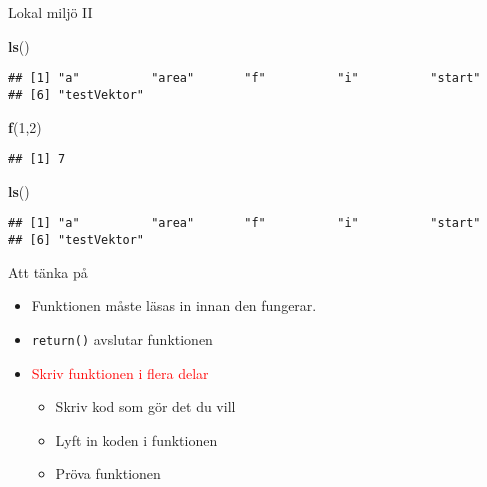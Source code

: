 \documentclass[
  10pt,
  ignorenonframetext,
]{beamer}
\newenvironment{Shaded}{\begin{snugshade}}{\end{snugshade}}
\newcommand{\DecValTok}[1]{\textcolor[rgb]{0.00,0.00,0.81}{#1}}
\newcommand{\FunctionTok}[1]{\textcolor[rgb]{0.13,0.29,0.53}{\textbf{#1}}}
\newcommand{\NormalTok}[1]{#1}
\providecommand{\tightlist}{%
  \setlength{\itemsep}{0pt}\setlength{\parskip}{0pt}}
\begin{document}
\begin{frame}[fragile]{Lokal miljö II}
\protect\hypertarget{lokal-miljuxf6-ii}{}
\begin{Shaded}
\begin{Highlighting}[]
\FunctionTok{ls}\NormalTok{()}
\end{Highlighting}
\end{Shaded}

\begin{verbatim}
## [1] "a"          "area"       "f"          "i"          "start"     
## [6] "testVektor"
\end{verbatim}

\begin{Shaded}
\begin{Highlighting}[]
\FunctionTok{f}\NormalTok{(}\DecValTok{1}\NormalTok{,}\DecValTok{2}\NormalTok{)}
\end{Highlighting}
\end{Shaded}

\begin{verbatim}
## [1] 7
\end{verbatim}

\begin{Shaded}
\begin{Highlighting}[]
\FunctionTok{ls}\NormalTok{()}
\end{Highlighting}
\end{Shaded}

\begin{verbatim}
## [1] "a"          "area"       "f"          "i"          "start"     
## [6] "testVektor"
\end{verbatim}
\end{frame}

\begin{frame}{Att tänka på}
\protect\hypertarget{att-tuxe4nka-puxe5}{}
\begin{itemize}
\tightlist
\item
  Funktionen måste läsas in innan den fungerar.
\item
  \texttt{return()} avslutar funktionen
\item
  \textcolor{red}{Skriv funktionen i flera delar}

  \begin{itemize}
  \tightlist
  \item
    Skriv kod som gör det du vill
  \item
    Lyft in koden i funktionen
  \item
    Pröva funktionen
  \end{itemize}
\end{itemize}
\end{frame}
\end{document}
